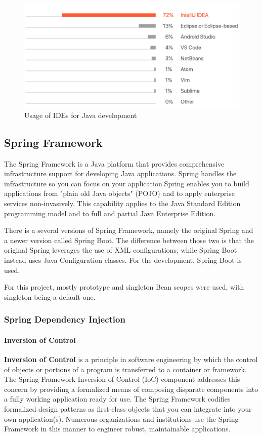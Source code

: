 \documentclass[thesis=M,english,hidelinks]{FITthesis}[2019/12/23]
\begin{document}
\begin{figure}
	\centering
	\includegraphics[width=0.7\linewidth]{ide_poll_results}
	\caption{Usage of IDEs for Java development}
	\label{fig:idepollresults}
\end{figure}

\subsection{Spring Framework}



The Spring Framework is a Java platform that provides comprehensive infrastructure support for developing Java applications. Spring handles the infrastructure so you can focus on your application.Spring enables you to build applications from "plain old Java objects" (\gls{POJO}) and to apply enterprise services non-invasively. This capability applies to the Java Standard Edition programming model and to full and partial Java Enterprise Edition\cite{spring_ref}.

There is a several versions of Spring Framework, namely the original Spring and a newer version called Spring Boot. The difference between those two is that the original Spring leverages the use of \gls{XML} configurations, while Spring Boot instead uses Java Configuration classes. For the development, Spring Boot is used.

For this project, mostly prototype and singleton Bean scopes were used, with singleton being a default one.

\subsubsection{Spring Dependency Injection}\label{spring}

\paragraph{Inversion of Control}
\textbf{Inversion of Control} is a principle in software engineering by which the control of objects or portions of a program is transferred to a container or framework. The Spring Framework Inversion of Control (IoC) component addresses this concern by providing a formalized means of composing disparate components into a fully working application ready for use. The Spring Framework codifies formalized design patterns as first-class objects that you can integrate into your own application(s). Numerous organizations and institutions use the Spring Framework in this manner to engineer robust, maintainable applications\cite{spring_ref}.
\end{document}

